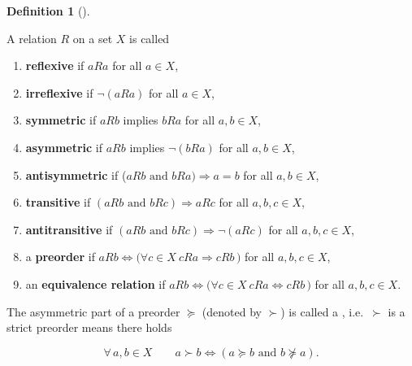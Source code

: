\documentclass[
  letterpaper,
  10pt,
  reqno,
  twopage,
  openany]{book}
\providecommand{\tightlist}{%
  \setlength{\itemsep}{0pt}\setlength{\parskip}{0pt}}\usepackage{longtable,booktabs,array}
\theoremstyle{plain}
\theoremstyle{definition}
\theoremstyle{definition}
\newtheorem{definition}{Definition}[chapter]
\theoremstyle{definition}
\theoremstyle{plain}
\theoremstyle{plain}
\theoremstyle{remark}
\begin{document}
\leavevmode{}%
\begin{definition}[]\label{def-relation-summary}

A relation \(R\) on a set \(X\) is called

\begin{enumerate}
\def\labelenumi{\arabic{enumi}.}
\tightlist
\item
   \textbf{reflexive} if \(aRa\) for all \(a\in X\),
\item
   \textbf{irreflexive} if \(\neg(aRa)\) for all
  \(a\in X\),
\item
   \textbf{symmetric} if \(aRb\) implies \(bRa\) for
  all \(a,b\in X\),
\item
   \textbf{asymmetric} if \(aRb\) implies
  \(\neg(bRa)\) for all \(a,b\in X\),
\item
   \textbf{antisymmetric} if
  (\(aRb \text { and } bRa) \Rightarrow a=b\) for all \(a,b\in X\),
\item
   \textbf{transitive} if
  \((aRb \text{ and } bRc)\Rightarrow aRc\) for all \(a,b,c\in X\),
\item
   \textbf{antitransitive} if
  \((aRb \text{ and } bRc)\Rightarrow \neg(aRc)\) for all
  \(a,b,c\in X\),
\item
  a  \textbf{preorder} if
  \(aRb \Leftrightarrow \big(\forall c\in X \ cRa \Rightarrow cRb\, \big)\)
  for all \(a,b,c\in X\),
\item
  an  \textbf{equivalence relation} if
  \(aRb \Leftrightarrow \big(\forall c\in X \ cRa \Leftrightarrow cRb\, \big)\)
  for all \(a,b,c\in X\).
\end{enumerate}

\end{definition}

The asymmetric part of a preorder \(\succeq\) (denoted by \(\succ\)) is
called a , i.e.~\(\succ\) is a strict preorder
means there holds

\begin{equation}
\forall \, a,b \in X \qquad
a\succ b \Leftrightarrow (a\succeq b \text{ and } b\not\succeq a).
\end{equation}
\end{document}
